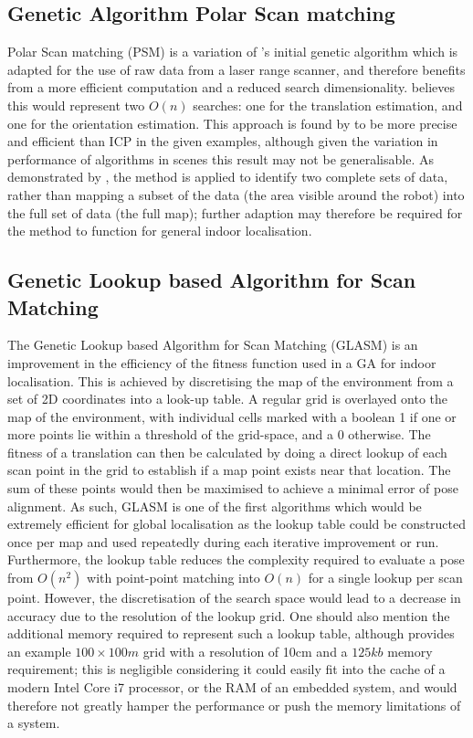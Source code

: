\documentclass[authoryearcitations]{UoYCSproject}
\begin{document}
\subsection{Genetic Algorithm Polar Scan matching}
Polar Scan matching (PSM) is a variation of \citeauthor{Robertson2002-ou}'s initial genetic algorithm which is adapted for the use of raw data from a laser range scanner, and therefore benefits from a more efficient computation and a reduced search dimensionality. \citet{Ze-Su2007-li} believes this would represent two $O(n)$ searches: one for the translation estimation, and one for the orientation estimation. This approach is found by \citeauthor{Ze-Su2007-li} to be more precise and efficient than ICP in the given examples, although given the variation in performance of algorithms in scenes \cite{Donoso2017-wp} this result may not be generalisable. As demonstrated by \citeauthor{Ze-Su2007-li}, the method is applied to identify two complete sets of data, rather than mapping a subset of the data (the area visible around the robot) into the full set of data (the full map); further adaption may therefore be required for the method to function for general indoor localisation.

\subsection{Genetic Lookup based Algorithm for Scan Matching}
The Genetic Lookup based Algorithm for Scan Matching (GLASM) \cite{Lenac2007-xm} is an improvement in the efficiency of the fitness function used in a GA for indoor localisation. This is achieved by discretising the map of the environment from a set of 2D coordinates into a look-up table. A regular grid is overlayed onto the map of the environment, with individual cells marked with a boolean 1 if one or more points lie within a threshold of the grid-space, and a 0 otherwise. The fitness of a translation can then be calculated by doing a direct lookup of each scan point in the grid to establish if a map point exists near that location. The sum of these points would then be maximised to achieve a minimal error of pose alignment. As such, GLASM is one of the first algorithms which would be extremely efficient for global localisation as the lookup table could be constructed once per map and used repeatedly during each iterative improvement or run. Furthermore, the lookup table reduces the complexity required to evaluate a pose from $O(n^2)$ with point-point matching into $O(n)$ for a single lookup per scan point. However, the discretisation of the search space would lead to a decrease in accuracy due to the resolution of the lookup grid. One should also mention the additional memory required to represent such a lookup table, although \citeauthor{Lenac2007-xm} provides an example $100\times100m$ grid with a resolution of 10cm and a $125kb$ memory requirement; this is negligible considering it could easily fit into the cache of a modern Intel Core i7 processor, or the RAM of an embedded system, and would therefore not greatly hamper the performance or push the memory limitations of a system. 
\end{document}
